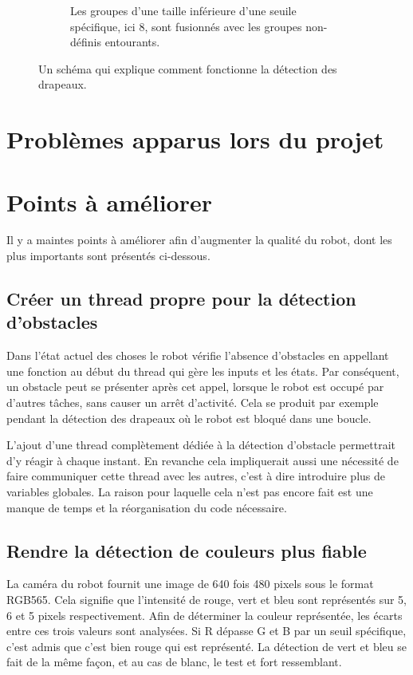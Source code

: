 \documentclass{article}
\begin{document}
\begin{figure}[!ht]
\begin{subfigure}{\textwidth}
            \caption{Les groupes d'une taille inférieure d'une seuile spécifique, ici 8, sont fusionnés avec les groupes non-définis entourants.}
        \end{subfigure}
        \caption{Un schéma qui explique comment fonctionne la détection des drapeaux.}
    \end{figure}

    \section{Problèmes apparus lors du projet}


    \section{Points à améliorer}
    Il y a maintes points à améliorer afin d'augmenter la qualité du robot, dont les plus importants sont présentés ci-dessous.

    \subsection{Créer un thread propre pour la détection d'obstacles}
    Dans l'état actuel des choses le robot vérifie l'absence d'obstacles en appellant une fonction au début du thread qui gère les inputs et les états.
    Par conséquent, un obstacle peut se présenter après cet appel, lorsque le robot est occupé par d'autres tâches, sans causer un arrêt d'activité.
    Cela se produit par exemple pendant la détection des drapeaux où le robot est bloqué dans une boucle.

    L'ajout d'une thread complètement dédiée à la détection d'obstacle permettrait d'y réagir à chaque instant.
    En revanche cela impliquerait aussi une nécessité de faire communiquer cette thread avec les autres, c'est à dire introduire plus de variables globales.
    La raison pour laquelle cela n'est pas encore fait est une manque de temps et la réorganisation du code nécessaire.

    \subsection{Rendre la détection de couleurs plus fiable}
    La caméra du robot fournit une image de 640 fois 480 pixels sous le format RGB565.
    Cela signifie que l'intensité de rouge, vert et bleu sont représentés sur 5, 6 et 5 pixels respectivement.
    Afin de déterminer la couleur représentée, les écarts entre ces trois valeurs sont analysées.
    Si R dépasse G et B par un seuil spécifique, c'est admis que c'est bien rouge qui est représenté.
    La détection de vert et bleu se fait de la même façon, et au cas de blanc, le test et fort ressemblant.
    
\end{document}
